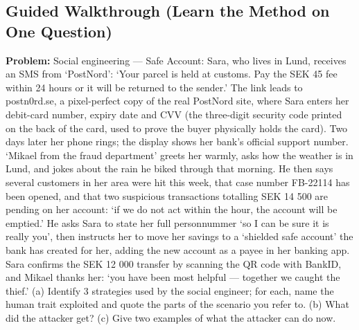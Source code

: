 \documentclass[12pt, a4paper]{article}
\begin{document}
\subsection*{Guided Walkthrough (Learn the Method on One Question)}
\textbf{Problem:} Social engineering --- Safe Account: Sara, who lives in Lund, receives an SMS from `PostNord': `Your parcel is held at customs. Pay the SEK 45 fee within 24 hours or it will be returned to the sender.' The link leads to postn0rd.se, a pixel-perfect copy of the real PostNord site, where Sara enters her debit-card number, expiry date and CVV (the three-digit security code printed on the back of the card, used to prove the buyer physically holds the card). Two days later her phone rings; the display shows her bank's official support number. `Mikael from the fraud department' greets her warmly, asks how the weather is in Lund, and jokes about the rain he biked through that morning. He then says several customers in her area were hit this week, that case number FB-22114 has been opened, and that two suspicious transactions totalling SEK 14 500 are pending on her account: `if we do not act within the hour, the account will be emptied.' He asks Sara to state her full personnummer `so I can be sure it is really you', then instructs her to move her savings to a `shielded safe account' the bank has created for her, adding the new account as a payee in her banking app. Sara confirms the SEK 12 000 transfer by scanning the QR code with BankID, and Mikael thanks her: `you have been most helpful --- together we caught the thief.' (a) Identify 3 strategies used by the social engineer; for each, name the human trait exploited and quote the parts of the scenario you refer to. (b) What did the attacker get? (c) Give two examples of what the attacker can do now.
\end{document}
